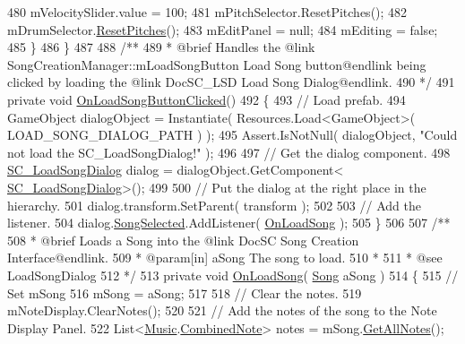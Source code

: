 \begin{DoxyCodeInclude}
480             mVelocitySlider.value = 100;
481             mPitchSelector.ResetPitches();
482             mDrumSelector.\hyperlink{group___s_c___p_s_c_pub_func_ga678ef561c5418e4bf43a5f9ed753f0f0}{ResetPitches}();
483             mEditPanel = null;
484             mEditing = \textcolor{keyword}{false};
485         \}
486     \}
487 \textcolor{comment}{}
488 \textcolor{comment}{    /**}
489 \textcolor{comment}{     * @brief Handles the @link SongCreationManager::mLoadSongButton Load Song button@endlink being clicked
       by loading the @link DocSC\_LSD Load Song Dialog@endlink.}
490 \textcolor{comment}{    */}
491     \textcolor{keyword}{private} \textcolor{keywordtype}{void} \hyperlink{group___s_c_m_handlers_ga1747d021ddb36a8c2c172315d6fbb3a8}{OnLoadSongButtonClicked}()
492     \{
493         \textcolor{comment}{// Load prefab.}
494         GameObject dialogObject = Instantiate( Resources.Load<GameObject>( LOAD\_SONG\_DIALOG\_PATH ) );
495         Assert.IsNotNull( dialogObject, \textcolor{stringliteral}{"Could not load the SC\_LoadSongDialog!"} );
496 
497         \textcolor{comment}{// Get the dialog component.}
498         \hyperlink{class_s_c___load_song_dialog}{SC\_LoadSongDialog} dialog = dialogObject.GetComponent<
      \hyperlink{class_s_c___load_song_dialog}{SC\_LoadSongDialog}>();
499 
500         \textcolor{comment}{// Put the dialog at the right place in the hierarchy.}
501         dialog.transform.SetParent( transform );
502 
503         \textcolor{comment}{// Add the listener.}
504         dialog.\hyperlink{group___s_c___l_s_d_events_ga48d606b2c8291fee822dcc2b14ddcecc}{SongSelected}.AddListener( \hyperlink{group___s_c_m_handlers_gae3791e700c2e12f1dd705c4b951ec260}{OnLoadSong} );
505     \}
506 \textcolor{comment}{}
507 \textcolor{comment}{    /**}
508 \textcolor{comment}{     * @brief Loads a Song into the @link DocSC Song Creation Interface@endlink.}
509 \textcolor{comment}{     * @param[in] aSong The song to load.}
510 \textcolor{comment}{     * }
511 \textcolor{comment}{     * @see LoadSongDialog}
512 \textcolor{comment}{    */}
513     \textcolor{keyword}{private} \textcolor{keywordtype}{void} \hyperlink{group___s_c_m_handlers_gae3791e700c2e12f1dd705c4b951ec260}{OnLoadSong}( \hyperlink{class_song}{Song} aSong )
514     \{
515         \textcolor{comment}{// Set mSong}
516         mSong = aSong;
517 
518         \textcolor{comment}{// Clear the notes.}
519         mNoteDisplay.ClearNotes();
520 
521         \textcolor{comment}{// Add the notes of the song to the Note Display Panel.}
522         List<\hyperlink{class_music}{Music}.\hyperlink{group___music_structs_struct_music_1_1_combined_note}{CombinedNote}> notes = mSong.\hyperlink{group___song_pub_func_ga842675b7691fca074ee394031afc7675}{GetAllNotes}();

\end{DoxyCodeInclude}
